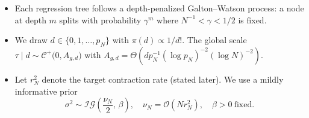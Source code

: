 \documentclass[11pt]{article}
\theoremstyle{plain}
\theoremstyle{definition}
\theoremstyle{plain}
\begin{document}
\begin{itemize}
\item[\textbf{(P1)}] Each regression tree follows a depth-penalized Galton–Watson process:
a node at depth $m$ splits with probability $\gamma^{m}$ where $N^{-1}<\gamma<1/2$ is fixed. 

\item[\textbf{(P2)}] We draw $d\in\{0,1,\dots,p_N\}$ with $\pi(d)\propto 1/d!$. The global scale $\tau\mid d \sim \mathcal C^+\!\bigl(0, A_{g,d}\bigr)$ with
$A_{g,d}=\Theta\left(dp_N^{-1}(\log p_N)^{-2}(\log N)^{-2}\right)$.

\item[\textbf{(P3)}] Let $r_N^2$ denote the target contraction rate (stated later). We use a mildly informative prior
\[
\sigma^2 \sim \mathcal{IG}\!\left(\frac{\nu_N}{2},\,\beta\right),
\quad \nu_N=\mathcal O(N r_N^2), \quad \beta>0\ \text{fixed}.
\]


\end{itemize}
\end{document}
